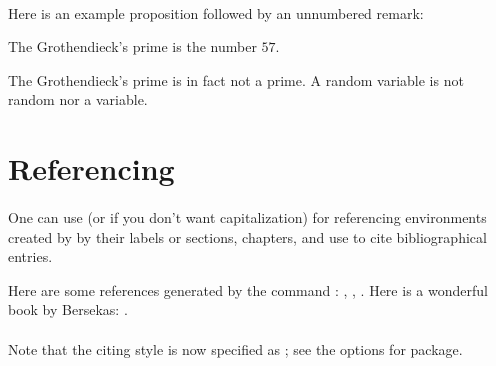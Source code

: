\paragraph{}Here is an example proposition followed by an unnumbered remark:

\begin{defn}\label{defn:groth-prime}
	The Grothendieck's prime is the number $57$.
\end{defn}

\begin{rmrk*}
	The Grothendieck's prime is in fact not a prime. A random variable is not random nor a variable.
\end{rmrk*}

\section{Referencing}
\label{sect:referencing}

\paragraph{}One can use  (or  if you don't want capitalization) for referencing environments created by  by their labels or sections, chapters, and use  to cite bibliographical entries.

\begin{exmp*}
	Here are some references generated by the command : , , . Here is a wonderful book by Bersekas: \cite{bertsekas2009convex}.
\end{exmp*}

\paragraph{}Note that the citing style is now specified as ; see the options for  package.


